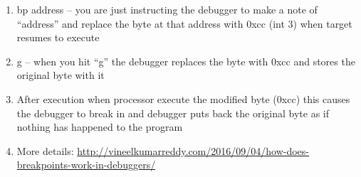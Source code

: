 \documentclass{article}
\begin{document}
\begin{enumerate}[noitemsep]
    \item bp address – you are just instructing the debugger to make a note of “address” and replace the byte at that address with 0xcc (int 3) when target resumes to execute
    \item g – when you hit “g” the debugger replaces the byte with 0xcc and stores the original byte with it
    \item After execution when processor execute the modified byte (0xcc) this causes the debugger to break in and debugger puts back the original byte as if nothing has happened to the program
    \item More details: \url{http://vineelkumarreddy.com/2016/09/04/how-does-breakpoints-work-in-debuggers/}
\end{enumerate}
\end{document}
